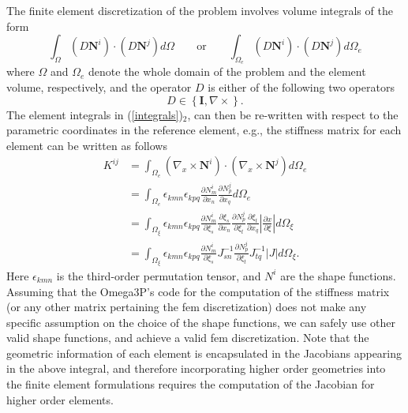 \documentclass[review,12pt]{elsarticle_summary_report}
\newcommand{\pr}[1]{\left( #1 \right)}
\newcommand{\cbr}[1]{\left\lbrace #1 \right\rbrace}
\newcommand{\abs}[1]{\left | #1 \right |}
\newcommand{\mref}[2]{(#1)$_{\text{#2}}$}
\begin{document}
The finite element discretization of the problem involves volume integrals of the form \cite{LeeLi_09}
\begin{equation}
  \int _\Omega \pr{D \textbf{N}^i} \cdot \pr{D \textbf{N}^j} d\Omega \quad \quad \text{or} \quad \quad \int _{\Omega _e} \pr{D \textbf{N}^i} \cdot \pr{D \textbf{N}^j} d\Omega _e	
  \label{integrals}
\end{equation}
where $\Omega$ and $\Omega _e$ denote the whole domain of the problem  and the element volume, respectively, and the operator $D$ is either of the following two operators 
\begin{equation}
  D \in \cbr{\textbf{I}, \nabla \times }.
\end{equation}
The element integrals in \mref{\ref{integrals}}{2}, can then be re-written with respect to the parametric coordinates in the reference element, e.g., the stiffness matrix for each element can be written as follows
\begin{equation}
\begin{aligned}
  K^{ij} 	&= \int _{\Omega _e} \pr{\nabla _x \times \textbf{N}^i} \cdot \pr{\nabla _x \times \textbf{N}^j} d\Omega _e \\
  &= \int _{\Omega _e} \epsilon _{kmn} \epsilon_{kpq} \frac{\partial N^i_m}{\partial x_n} \frac{\partial N^j_p}{\partial x_q}   d\Omega _e \\
  &= \int _{\Omega _\xi} \epsilon _{kmn} \epsilon_{kpq} \frac{\partial N^i_m}{\partial \xi_s} \frac{\partial \xi_s}{\partial x_n}  \frac{\partial N^j_p}{\partial \xi_t}  \frac{\partial \xi_t}{\partial x_q} \abs{\frac{\partial x}{\partial \xi}  } d\Omega _\xi \\
  &= \int _{\Omega _\xi} \epsilon _{kmn} \epsilon_{kpq} \frac{\partial N^i_m}{\partial \xi_s} J^{-1}_{sn}  \frac{\partial N^j_p}{\partial \xi_t}  J^{-1}_{tq} \abs{J} d\Omega _\xi.
\end{aligned}
\end{equation}
Here $\epsilon_{kmn}$ is the third-order permutation tensor, and $N^i$ are the shape functions. Assuming that the Omega3P's code for the computation of the stiffness matrix (or any other matrix pertaining the fem discretization) does not make any specific assumption on the choice of the shape functions, we can safely use other valid shape functions, and  achieve a valid fem discretization. Note that the geometric information of each element is encapsulated in the Jacobians appearing in the above integral, and therefore incorporating higher order geometries into the finite element formulations requires the computation of the Jacobian for higher order elements.  
\end{document}
